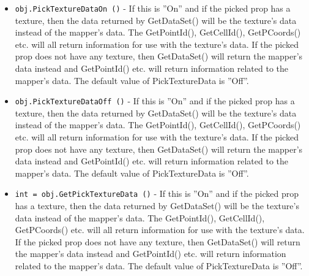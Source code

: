 \begin{itemize}
\item  \verb|obj.PickTextureDataOn ()| -  If this is ''On'' and if the picked prop has a texture, then the data
 returned by GetDataSet() will be the texture's data instead of the
 mapper's data.  The GetPointId(), GetCellId(), GetPCoords() etc. will
 all return information for use with the texture's data.  If the picked
 prop does not have any texture, then GetDataSet() will return the
 mapper's data instead and GetPointId() etc. will return information
 related to the mapper's data.  The default value of PickTextureData
 is ''Off''.

\item  \verb|obj.PickTextureDataOff ()| -  If this is ''On'' and if the picked prop has a texture, then the data
 returned by GetDataSet() will be the texture's data instead of the
 mapper's data.  The GetPointId(), GetCellId(), GetPCoords() etc. will
 all return information for use with the texture's data.  If the picked
 prop does not have any texture, then GetDataSet() will return the
 mapper's data instead and GetPointId() etc. will return information
 related to the mapper's data.  The default value of PickTextureData
 is ''Off''.

\item  \verb|int = obj.GetPickTextureData ()| -  If this is ''On'' and if the picked prop has a texture, then the data
 returned by GetDataSet() will be the texture's data instead of the
 mapper's data.  The GetPointId(), GetCellId(), GetPCoords() etc. will
 all return information for use with the texture's data.  If the picked
 prop does not have any texture, then GetDataSet() will return the
 mapper's data instead and GetPointId() etc. will return information
 related to the mapper's data.  The default value of PickTextureData
 is ''Off''.

\end{itemize}
